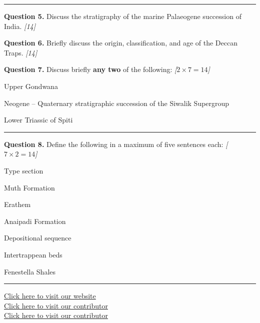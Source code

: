 \documentclass[11pt,a4paper]{article}
\newcommand{\pts}[1]{\hfill   \textit{[#1]}}
\begin{document}
\bigskip


\rule{\linewidth}{0.4pt}\smallskip




\noindent   \textbf{Question 5.} Discuss the stratigraphy of the marine Palaeogene succession of India. \pts{14}

\medskip


\noindent   \textbf{Question 6.} Briefly discuss the origin, classification, and age of the Deccan Traps. \pts{14}

\medskip


\noindent   \textbf{Question 7.} Discuss briefly   \textbf{any two} of the following: \pts{$2  \times 7 = 14$}

\begin{parts}
  \item Upper Gondwana
  \item Neogene -- Quaternary stratigraphic succession of the Siwalik Supergroup
  \item Lower Triassic of Spiti
\end{parts}

\bigskip


\rule{\linewidth}{0.4pt}\smallskip




\noindent   \textbf{Question 8.} Define the following in a maximum of five sentences each: \pts{$7  \times 2 = 14$}

\begin{parts}
  \item Type section
  \item Muth Formation
  \item Erathem
  \item Anaipadi Formation
  \item Depositional sequence
  \item Intertrappean beds
  \item Fenestella Shales
\end{parts}

\vfill\rule{\linewidth}{0.4pt}

\begin{center}\small
\href{https://bhu-exam.vercel.app/}{Click here to visit our website}\\[4pt]
\href{https://me-aryan.vercel.app/}{Click here to visit our contributor}\\[4pt]
\href{https://quashan-me.vercel.app/}{Click here to visit our contributor}
\end{center}
\end{document}
